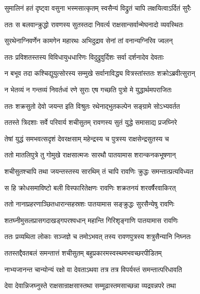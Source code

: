 
\twolineshloka
{सुमालिनं हतं दृष्ट्वा वसुना भस्मसात्कृतम्}
{स्वसैन्यं विद्रुतं चापि लक्षयित्वाऽर्दितं सुरैः} %

\twolineshloka
{ततः स बलवान्क्रुद्धो रावणस्य सुतस्तदा}
{निवर्त्य राक्षसान्सर्वान्मेघनादो व्यवस्थितः} %

\twolineshloka
{सुरथेनाग्निवर्णेन कामगेन महारथः}
{अभिदुद्राव सेनां तां वनान्यग्निरिव ज्वलन्} %

\twolineshloka
{ततः प्रविशतस्तस्य विविधायुधधारिणः}
{विदुद्रुवुर्दिशः सर्वा दर्शनादेव देवताः} %

\twolineshloka
{न बभूव तदा कश्चिद्युयुत्सोरस्य सम्मुखे}
{सर्वानाविद्ध्य वित्रस्तांस्ततः शक्रोऽब्रवीत्सुरान्} %

\twolineshloka
{न भेतव्यं न गन्तव्यं निवर्तध्वं रणे सुराः}
{एष गच्छति पुत्रो मे युद्धार्थमपराजितः} %

\twolineshloka
{ततः शक्रसुतो देवो जयन्त इति विश्रुतः}
{रथेनाद्भुतकल्पेन सङ्ग्रामे सोऽभ्यवर्तत} %

\twolineshloka
{ततस्ते त्रिदशाः सर्वे परिवार्य शचीसुतम्}
{रावणस्य सुतं युद्धे समासाद्य प्रजघ्निरे} %

\twolineshloka
{तेषां युद्धं समभवत्सदृशं देवरक्षसाम्}
{महेन्द्रस्य च पुत्रस्य राक्षसेन्द्रसुतस्य च} %

\twolineshloka
{ततो मातलिपुत्रे तु गोमुखे राक्षसात्मजः}
{सारथौ पातयामास शरान्कनकभूषणान्} %

\twolineshloka
{शचीसुतश्चापि तथा जयन्तस्तस्य सारथिम्}
{तं चापि रावणिः क्रुद्धः समन्तात्प्रत्यविध्यत} %

\twolineshloka
{स हि क्रोधसमाविष्टो बली विस्फारितेक्षणः}
{रावणिः शक्रतनयं शरवर्षैरवाकिरत्} %

\twolineshloka
{ततो नानाप्रहरणाञ्छितधारान्सहस्रशः}
{पातयामास सङ्क्रुद्धः सुरसैन्येषु रावणिः} %

\twolineshloka
{शतघ्नीमुसलप्रासगदाखड्गपरश्वधान्}
{महान्ति गिरिशृङ्गाणि पातयामास रावणिः} %

\twolineshloka
{ततः प्रव्यथिता लोकाः सञ्जज्ञे च तमोऽभवत्}
{तस्य रावणपुत्रस्य शत्रुसैन्यानि निघ्नतः} %

\twolineshloka
{ततस्तद्दैवतबलं समन्तात्तं शचीसुतम्}
{बहुप्रकारमस्वस्थमभवच्छरपीडितम्} %

\twolineshloka
{नाभ्यजानन्त चान्योन्यं रक्षो वा देवताऽथवा}
{तत्र तत्र विपर्यस्तं समन्तात्परिधावति} %

\twolineshloka
{देवा देवान्निजघ्नुस्ते राक्षसान्राक्षसास्तथा}
{सम्मूढास्तमसाच्छन्ना व्यद्रवन्नपरे तथा} %

